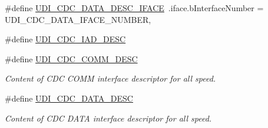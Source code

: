 \begin{DoxyCompactItemize}
\#define \hyperlink{group__udi__cdc__group_gaccf2e8998f50f5d955bf54266c28c484}{\-U\-D\-I\-\_\-\-C\-D\-C\-\_\-\-D\-A\-T\-A\-\_\-\-D\-E\-S\-C\-\_\-\-I\-F\-A\-C\-E}~.iface.\-b\-Interface\-Number       = \-U\-D\-I\-\_\-\-C\-D\-C\-\_\-\-D\-A\-T\-A\-\_\-\-I\-F\-A\-C\-E\-\_\-\-N\-U\-M\-B\-E\-R,
\item 
\#define \hyperlink{group__udi__cdc__group_ga1e55408092fbf059c01ab7e81b7fd910}{\-U\-D\-I\-\_\-\-C\-D\-C\-\_\-\-I\-A\-D\-\_\-\-D\-E\-S\-C}
\item 
\#define \hyperlink{group__udi__cdc__group_ga7970530df36eefc5119aadd584f82de8}{\-U\-D\-I\-\_\-\-C\-D\-C\-\_\-\-C\-O\-M\-M\-\_\-\-D\-E\-S\-C}
\begin{DoxyCompactList}\small\item\em \-Content of \-C\-D\-C \-C\-O\-M\-M interface descriptor for all speed. \end{DoxyCompactList}\item 
\#define \hyperlink{group__udi__cdc__group_gade744816217f972675f9e7e5c2204d93}{\-U\-D\-I\-\_\-\-C\-D\-C\-\_\-\-D\-A\-T\-A\-\_\-\-D\-E\-S\-C}
\begin{DoxyCompactList}\small\item\em \-Content of \-C\-D\-C \-D\-A\-T\-A interface descriptor for all speed. \end{DoxyCompactList}\end{DoxyCompactItemize}
